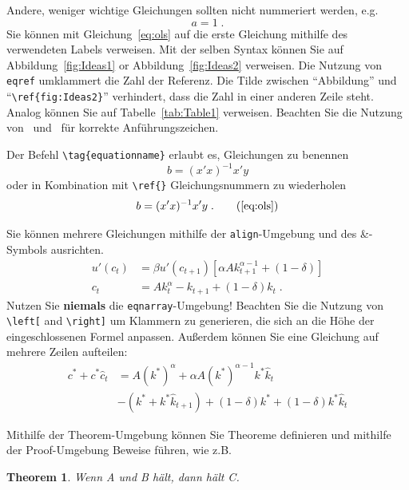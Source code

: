 \documentclass[a4paper,12pt]{scrartcl} %
\newtheorem{theorem}{Theorem} %
\begin{document}
Andere, weniger wichtige Gleichungen sollten nicht nummeriert werden, e.g.\
\begin{equation*}
	a = 1\;.
\end{equation*}
Sie können mit Gleichung~\eqref{eq:ols} auf die erste Gleichung mithilfe des verwendeten Labels verweisen. Mit der selben Syntax können Sie auf Abbildung~\ref{fig:Ideas1} or Abbildung~\ref{fig:Ideas2} verweisen. Die Nutzung von \texttt{eqref} umklammert die Zahl der Referenz. Die Tilde zwischen ``Abbildung'' und ``\verb|\ref{fig:Ideas2}|'' verhindert, dass die Zahl in einer anderen Zeile steht. Analog können Sie auf Tabelle~\ref{tab:Table1} verweisen. Beachten Sie die Nutzung von \textasciigrave\textasciigrave\ und \textquotesingle\textquotesingle\ für korrekte Anführungszeichen.

Der Befehl \verb|\tag{equationname}| erlaubt es, Gleichungen zu benennen
\begin{equation}
	b = (x'x)^{-1}x'y \tag{OLS Estimator}
\end{equation}
oder in Kombination mit \verb|\ref{}| Gleichungsnummern zu wiederholen
\begin{equation}
	b = (x'x)^{-1}x'y \;. \tag{\ref{eq:ols}}
\end{equation}

Sie können mehrere Gleichungen mithilfe der \texttt{align}-Umgebung und des \&-Symbols ausrichten.
\begin{align}
	u'(c_t)&= \beta u'(c_{t+1}) \left[\alpha A k_{t+1}^{\alpha-1} +(1-\delta)\right] \label{euler}\\
    c_t &=Ak_t^{\alpha} - k_{t+1} + (1-\delta)k_t \;.\label{ressource}
\end{align}
Nutzen Sie \textbf{niemals} die \texttt{eqnarray}-Umgebung! Beachten Sie die Nutzung von \verb|\left[| and \verb|\right]| um Klammern zu generieren, die sich an die Höhe der eingeschlossenen Formel anpassen. Außerdem können Sie eine Gleichung auf mehrere Zeilen aufteilen:
\begin{equation}
	\begin{split}
        c^* + c^* \hat{c}_{t} &= A\left(k^*\right)^{\alpha} + \alpha A \left(k^*\right)^{\alpha-1} k^* \hat{k}_t \\
                              &- \left( k^* + k^* \hat{k}_{t+1}\right) + (1-\delta)k^* + (1-\delta) k^* \hat{k}_t
    \end{split}
\end{equation}

Mithilfe der Theorem-Umgebung können Sie Theoreme definieren und mithilfe der Proof-Umgebung Beweise führen, wie z.B.\
\begin{theorem}
Wenn A und B hält, dann hält C.
\end{theorem}
\end{document}
